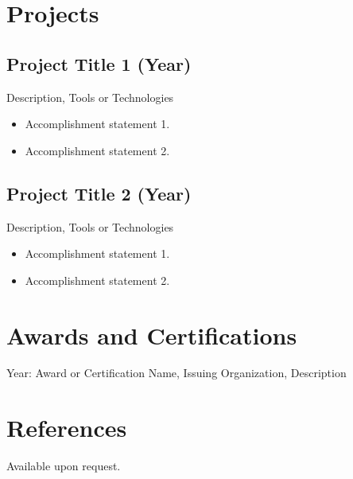 \documentclass[letterpaper, 10pt]{article}
\begin{document}
\section*{Projects}
\subsection*{Project Title 1 (Year)}
Description, Tools or Technologies
\begin{itemize}
  \item Accomplishment statement 1.
  \item Accomplishment statement 2.
\end{itemize}

\subsection*{Project Title 2 (Year)}
Description, Tools or Technologies
\begin{itemize}
  \item Accomplishment statement 1.
  \item Accomplishment statement 2.
\end{itemize}

\section*{Awards and Certifications}
Year: Award or Certification Name, Issuing Organization, Description

\section*{References}
Available upon request.
\end{document}
